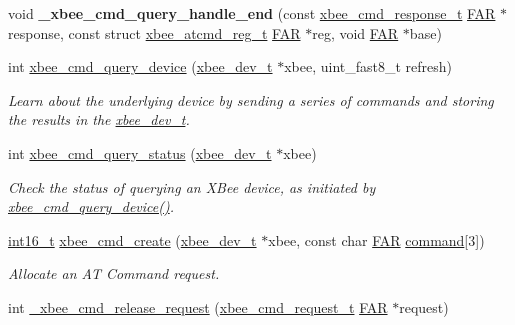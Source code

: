 \begin{DoxyCompactItemize}
\item 
\mbox{\label{group__xbee__atcmd_gafdbf73f2f7ab0efaa371e912f36ac8cb}} 
void {\bfseries \+\_\+xbee\+\_\+cmd\+\_\+query\+\_\+handle\+\_\+end} (const \hyperlink{structxbee__cmd__response__t}{xbee\+\_\+cmd\+\_\+response\+\_\+t} \hyperlink{group__hal_gaef060b3456fdcc093a7210a762d5f2ed}{F\+AR} $\ast$response, const struct \hyperlink{structxbee__atcmd__reg__t}{xbee\+\_\+atcmd\+\_\+reg\+\_\+t} \hyperlink{group__hal_gaef060b3456fdcc093a7210a762d5f2ed}{F\+AR} $\ast$reg, void \hyperlink{group__hal_gaef060b3456fdcc093a7210a762d5f2ed}{F\+AR} $\ast$base)
\item 
int \hyperlink{group__xbee__atcmd_ga12317255ca84c2539b7d7a58816eccab}{xbee\+\_\+cmd\+\_\+query\+\_\+device} (\hyperlink{structxbee__dev__t}{xbee\+\_\+dev\+\_\+t} $\ast$xbee, uint\+\_\+fast8\+\_\+t refresh)
\begin{DoxyCompactList}\small\item\em Learn about the underlying device by sending a series of commands and storing the results in the \hyperlink{structxbee__dev__t}{xbee\+\_\+dev\+\_\+t}. \end{DoxyCompactList}\item 
int \hyperlink{group__xbee__atcmd_ga83f36dfc3c3cd2c4046719ea6e9cc53c}{xbee\+\_\+cmd\+\_\+query\+\_\+status} (\hyperlink{structxbee__dev__t}{xbee\+\_\+dev\+\_\+t} $\ast$xbee)
\begin{DoxyCompactList}\small\item\em Check the status of querying an X\+Bee device, as initiated by \hyperlink{group__xbee__atcmd_ga12317255ca84c2539b7d7a58816eccab}{xbee\+\_\+cmd\+\_\+query\+\_\+device()}. \end{DoxyCompactList}\item 
\hyperlink{group__hal__dos_ga2140805d08462d474b82ddc8d1c2f3e6}{int16\+\_\+t} \hyperlink{group__xbee__atcmd_gab73aaf873be6f9e515dcd65748a7f21c}{xbee\+\_\+cmd\+\_\+create} (\hyperlink{structxbee__dev__t}{xbee\+\_\+dev\+\_\+t} $\ast$xbee, const char \hyperlink{group__hal_gaef060b3456fdcc093a7210a762d5f2ed}{F\+AR} \hyperlink{group__xbee__atcmd_ga1a5aaa930940857f68f245eeb89506b5}{command}\mbox{[}3\mbox{]})
\begin{DoxyCompactList}\small\item\em Allocate an AT Command request. \end{DoxyCompactList}\item 
int \hyperlink{group__xbee__atcmd_ga899d5ef84ca5790c3c76b965f88874e0}{\+\_\+xbee\+\_\+cmd\+\_\+release\+\_\+request} (\hyperlink{structxbee__cmd__request__t}{xbee\+\_\+cmd\+\_\+request\+\_\+t} \hyperlink{group__hal_gaef060b3456fdcc093a7210a762d5f2ed}{F\+AR} $\ast$request)

\end{DoxyCompactItemize}
